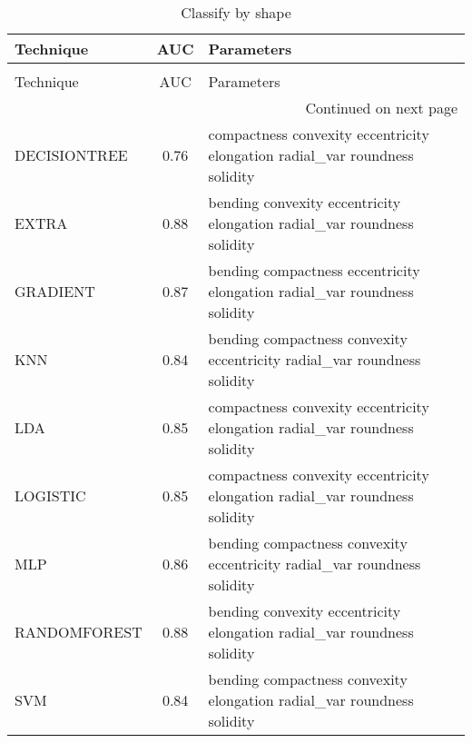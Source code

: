 \begin{longtable}{lcl}
\caption[Classify by shape]{Classify by shape}
\label{table:results-shape}\\
\toprule
   Technique &  AUC &                                                                  Parameters \\
\midrule
\endfirsthead
\caption[]{Classify by shape} \\
\toprule
   Technique &  AUC &                                                                  Parameters \\
\midrule
\endhead
\midrule
\multicolumn{3}{r}{{Continued on next page}} \\
\midrule
\endfoot

\bottomrule
\endlastfoot
DECISIONTREE & 0.76 & \begin{minipage}[t]{0.5\textwidth} compactness convexity eccentricity elongation radial\_var roundness solidity \end{minipage}\\
\midrule
EXTRA & 0.88 &\begin{minipage}[t]{0.5\textwidth}     bending convexity eccentricity elongation radial\_var roundness solidity \end{minipage}\\
\midrule
GRADIENT & 0.87 &\begin{minipage}[t]{0.5\textwidth}   bending compactness eccentricity elongation radial\_var roundness solidity \end{minipage}\\
\midrule
KNN & 0.84 &\begin{minipage}[t]{0.5\textwidth}    bending compactness convexity eccentricity radial\_var roundness solidity \end{minipage}\\
\midrule
LDA & 0.85 &\begin{minipage}[t]{0.5\textwidth} compactness convexity eccentricity elongation radial\_var roundness solidity \end{minipage}\\
\midrule
LOGISTIC & 0.85 &\begin{minipage}[t]{0.5\textwidth} compactness convexity eccentricity elongation radial\_var roundness solidity \end{minipage}\\
\midrule
MLP & 0.86 &\begin{minipage}[t]{0.5\textwidth}    bending compactness convexity eccentricity radial\_var roundness solidity \end{minipage}\\
\midrule
RANDOMFOREST & 0.88 &\begin{minipage}[t]{0.5\textwidth}     bending convexity eccentricity elongation radial\_var roundness solidity \end{minipage}\\
\midrule
SVM & 0.84 & \begin{minipage}[t]{0.5\textwidth}     bending compactness convexity elongation radial\_var roundness solidity \end{minipage}\\
\end{longtable}
